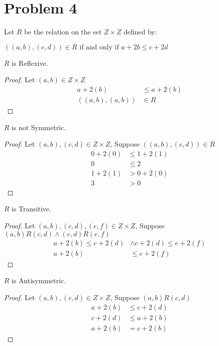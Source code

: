\documentclass{article}
\newenvironment{problem}[1]{
  \nobreak\section*{Problem #1}
}{}
\begin{document}
  \begin{problem}{4}
    Let $R$ be the relation on the set $Z \times Z$ defined by:
    \begin{center}
      $((a, b),(c, d)) \in R \text{ if and only if } a + 2b \le c + 2d$
    \end{center}

    $R$ is Reflexive.
    \begin{proof}
      Let $(a, b) \in Z \times Z$
      \begin{equation*}
        \begin{split}
          a + 2(b) & \le a + 2(b)\\
          ((a, b), (a, b)) & \in R
        \end{split}
      \end{equation*}
    \end{proof}

    $R$ is not Symmetric.
    \begin{proof}
      Let $(a, b), (c, d) \in Z \times Z$, Suppose $((a, b), (c, d)) \in R$
      \begin{equation*}
        \begin{split}
          0 + 2(0) & \le 1 + 2(1)\\
          0 & \le 2\\
          1 + 2(1) & > 0 + 2(0)\\
          3 & > 0
        \end{split}
      \end{equation*}
    \end{proof}

    $R$ is Transitive.
    \begin{proof}
      Let $(a, b), (c, d), (e, f) \in Z \times Z$, Suppose $(a, b) R (c, d) \wedge (c, d) R (e, f)$
      \begin{equation*}
        \begin{split}
          a + 2(b) \le c + 2(d) & \wedge c + 2(d) \le e + 2(f)\\
          a + 2(b) & \le e + 2(f) 
        \end{split}
      \end{equation*}
    \end{proof}

    $R$ is Antisymmetric.
    \begin{proof}
      Let $(a, b), (c, d) \in Z \times Z$, Suppose $(a, b) R (c, d)$
      \begin{equation*}
        \begin{split}
          a + 2(b) & \le c + 2(d)\\
          c + 2(d) & \le a + 2(b)\\
          a + 2(b) & = c + 2(b)
        \end{split}
      \end{equation*}
    \end{proof}
  \end{problem}
\end{document}
